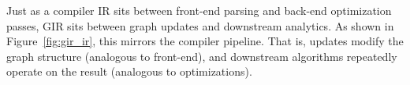 Just as a compiler IR sits between front-end parsing and back-end optimization passes, GIR sits between graph updates and downstream analytics.
As shown in Figure~\ref{fig:gir_ir}, this mirrors the compiler
pipeline. That is, updates modify the graph structure (analogous to front-end), 
and downstream algorithms repeatedly operate on the result
(analogous to optimizations).






